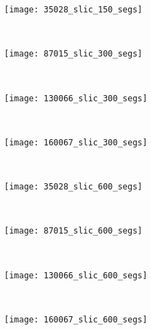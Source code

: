 \begin{figure}[!ht]
    \begin{subfigure}[t]{\textwidth+20pt\relax}
    	\texttt{[image: 35028\_slic\_150\_segs]} 
    \end{subfigure}      
    ~ %
    \begin{subfigure}[b]{0.2\textwidth}
        \texttt{[image: 87015\_slic\_300\_segs]}
    \end{subfigure}
    ~ %
    \begin{subfigure}[b]{0.2\textwidth}
        \texttt{[image: 130066\_slic\_300\_segs]}
    \end{subfigure}
    ~ %
    \begin{subfigure}[b]{0.2\textwidth}
        \texttt{[image: 160067\_slic\_300\_segs]}
    \end{subfigure} \\ [2ex]
    
    \begin{subfigure}[t]{\textwidth+20pt\relax}
    	\texttt{[image: 35028\_slic\_600\_segs]} 
    \end{subfigure}      
    ~ %
    \begin{subfigure}[b]{0.2\textwidth}
        \texttt{[image: 87015\_slic\_600\_segs]}
    \end{subfigure}
    ~ %
    \begin{subfigure}[b]{0.2\textwidth}
        \texttt{[image: 130066\_slic\_600\_segs]}
    \end{subfigure}
    ~ %
    \begin{subfigure}[b]{0.2\textwidth}
        \texttt{[image: 160067\_slic\_600\_segs]}
    \end{subfigure}     

	\caption{}\label{fig:slic_suprepixels}    
\end{figure}


